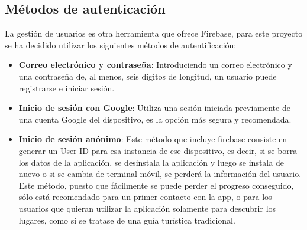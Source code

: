 \subsection{Métodos de autenticación}
La gestión de usuarios es otra herramienta que ofrece Firebase, para este proyecto se ha decidido utilizar los siguientes métodos de autentificación:
\begin{itemize}
\item \textbf{Correo electrónico y contraseña}: Introduciendo un correo electrónico y una contraseña de, al menos, seis dígitos de longitud, un usuario puede registrarse e iniciar sesión.
\item \textbf{Inicio de sesión con Google}: Utiliza una sesión iniciada previamente de una cuenta Google del dispositivo, es la opción más segura y recomendada.
\item \textbf{Inicio de sesión anónimo}: Este método que incluye firebase consiste en generar un User ID para esa instancia de ese dispositivo, es decir, si se borra los datos de la aplicación, se desinstala la aplicación y luego se instala de nuevo o si se cambia de terminal móvil, se perderá la información del usuario. Este método, puesto que fácilmente se puede perder el progreso conseguido, sólo está recomendado para un primer contacto con la app, o para los usuarios que quieran utilizar la aplicación solamente para descubrir los lugares, como si se tratase de una guía turística tradicional.
\end{itemize}